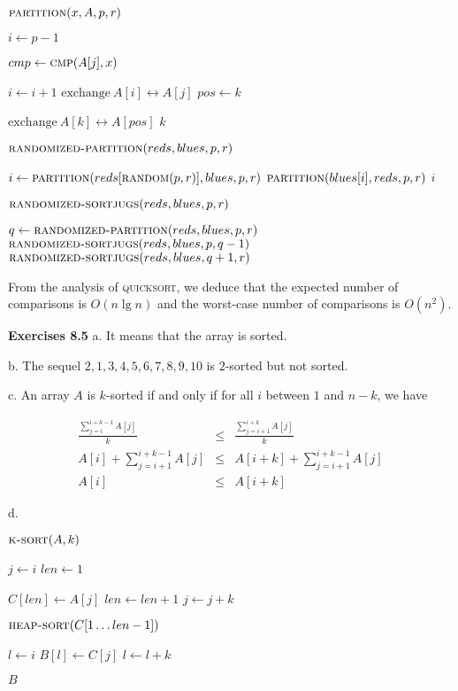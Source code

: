 \documentclass[a4paper,12pt]{article}
\newcommand{\newpar}[1]
{\bigskip \noindent \textbf{Exercises #1} \newline}
\newcommand{\subpar}[1]{\medskip \noindent #1.}
\newcommand{\la}{\leftarrow}
\newcommand{\exchange}[2]{\mathrm{exchange}\ #1 \leftrightarrow #2}
\newenvironment{alg}[2]
               {\noindent $\textsc{#1}(#2)$ \begin{algorithmic}}
               {\end{algorithmic}}
\begin{document}
\begin{alg}{partition}{x, A, p, r}
  \STATE $i \la p-1$

  \FOR {$j \la p$ \textbf{to} $r$}
  \STATE $cmp \la \textsc{cmp}(A[j], x)$

  \STATE $i \la i+1$
  \STATE $\exchange{A[i]}{A[j]}$
  \STATE $pos \la k$
  \ENDIF
  \ENDIF
  \ENDFOR

  \STATE $\exchange{A[k]}{A[pos]}$
  \RETURN $k$
\end{alg}

\newpage
\begin{alg}{randomized-partition}{reds, blues, p, r}
  \STATE $i \la \textsc{partition}(reds[\textsc{random}(p, r)], blues, p, r)$
  \STATE $\textsc{partition}(blues[i], reds, p, r)$
  \RETURN $i$
\end{alg}

\medskip
\begin{alg}{randomized-sortjugs}{reds, blues, p, r}
  \STATE $q \la \textsc{randomized-partition}(reds, blues, p, r)$
  \STATE $\textsc{randomized-sortjugs}(reds, blues, p, q-1)$
  \STATE $\textsc{randomized-sortjugs}(reds, blues, q+1, r)$
  \ENDIF
\end{alg}

From the analysis of \textsc{quicksort}, we deduce that the expected
number of comparisons is $O(n\lg n)$ and the worst-case number of
comparisons is $O(n^2)$.

\newpar{8.5}
\subpar{a} It means that the array is sorted.

\subpar{b} The sequel $2, 1, 3, 4, 5, 6, 7, 8, 9, 10$ is $2$-sorted
but not sorted.

\subpar{c} An array $A$ is $k$-sorted if and only if for all $i$
between $1$ and $n-k$, we have

\begin{eqnarray*}
  \frac{\sum_{j=i}^{i+k-1}A[j]}{k} &\le&
  \frac{\sum_{j=i+1}^{i+k}A[j]}{k} \\
  A[i] + \sum_{j=i+1}^{i+k-1}A[j] &\le& A[i+k] + \sum_{j=i+1}^{i+k-1}
  A[j] \\
  A[i] &\le& A[i+k]
\end{eqnarray*}

\subpar{d}

\begin{alg}{k-sort}{A, k}
  \STATE {}
  \FOR {$i\la 1$ \textbf{to} $k$}
  	\STATE $j \la i$
  	\STATE $len \la 1$

  		\STATE $C[len] \la A[j]$
  		\STATE $len \la len+1$
  		\STATE $j \la j+k$
  	\ENDWHILE

  	\STATE $\textsc{heap-sort}(C[1\ldots len-1])$

  	\STATE $l \la i$
  	\FOR {$j \la 1$ \textbf{to} $len$}
  		\STATE $B[l] \la C[j]$
  	\STATE $l \la l+k$
  \ENDFOR

  \ENDFOR

  \RETURN $B$
\end{alg}
\end{document}
